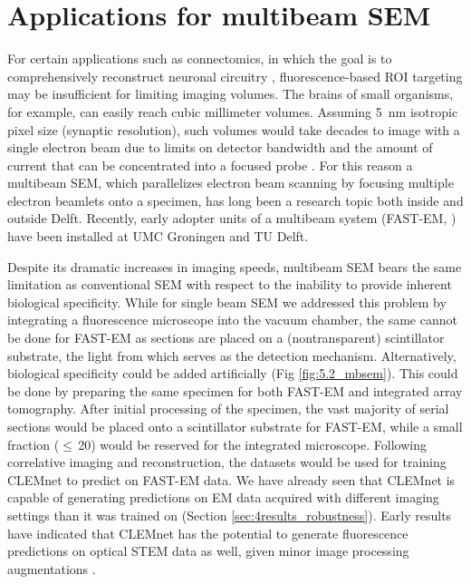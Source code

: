\section{Applications for multibeam SEM}
\label{sec:5.2_mbsem}

For certain applications such as connectomics, in which the goal is to comprehensively reconstruct neuronal circuitry \cite{briggman2012volume}, fluorescence-based ROI targeting may be insufficient for limiting imaging volumes. The brains of small organisms, for example, can easily reach cubic millimeter volumes. Assuming \SI{5}{\nano\meter} isotropic pixel size (synaptic resolution), such volumes would take decades to image with a single electron beam due to limits on detector bandwidth and the amount of current that can be concentrated into a focused probe \cite{eberle2015high, kornfeld2018progress}. For this reason a multibeam SEM, which parallelizes electron beam scanning by focusing multiple electron beamlets onto a specimen, has long been a research topic both inside \cite{zhang2008electron, mohammadi2013beams, ren2017imaging} and outside \cite{eberle2015high, eberle2018multi, riedesel2019first, wei2020mitoem} Delft. Recently, early adopter units of a multibeam system (FAST-EM, \cite{fermie2021high}) have been installed at UMC Groningen and TU Delft.

Despite its dramatic increases in imaging speeds, multibeam SEM bears the same limitation as conventional SEM with respect to the inability to provide inherent biological specificity. While for single beam SEM we addressed this problem by integrating a fluorescence microscope into the vacuum chamber, the same cannot be done for FAST-EM as sections are placed on a (nontransparent) scintillator substrate, the light from which serves as the detection mechanism. Alternatively, biological specificity could be added artificially (Fig \ref{fig:5.2_mbsem}). This could be done by preparing the same specimen for both FAST-EM and integrated array tomography. After initial processing of the specimen, the vast majority of serial sections would be placed onto a scintillator substrate for FAST-EM, while a small fraction ($\le$\,20) would be reserved for the integrated microscope. Following correlative imaging and reconstruction, the datasets would be used for training CLEMnet to predict on FAST-EM data. We have already seen that CLEMnet is capable of generating predictions on EM data acquired with different imaging settings than it was trained on (Section \ref{sec:4results_robustness}). Early results have indicated that CLEMnet has the potential to generate fluorescence predictions on optical STEM data as well, given minor image processing augmentations \cite{abels2022}.

